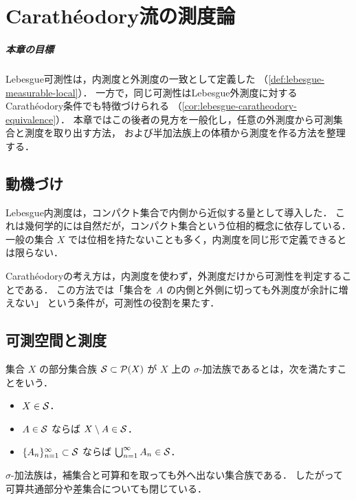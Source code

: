 \setcounter{chapter}{5}
\chapter{Carathéodory流の測度論}

\paragraph{本章の目標}
Lebesgue可測性は，内測度と外測度の一致として定義した
（\cref{def:lebesgue-measurable-local}）．
一方で，同じ可測性はLebesgue外測度に対するCarathéodory条件でも特徴づけられる
（\cref{cor:lebesgue-caratheodory-equivalence}）．
本章ではこの後者の見方を一般化し，任意の外測度から可測集合と測度を取り出す方法，
および半加法族上の体積から測度を作る方法を整理する．

\section{動機づけ}

Lebesgue内測度は，コンパクト集合で内側から近似する量として導入した．
これは幾何学的には自然だが，コンパクト集合という位相的概念に依存している．
一般の集合 $X$ では位相を持たないことも多く，内測度を同じ形で定義できるとは限らない．

Carathéodoryの考え方は，内測度を使わず，外測度だけから可測性を判定することである．
この方法では「集合を $A$ の内側と外側に切っても外測度が余計に増えない」
という条件が，可測性の役割を果たす．

\section{可測空間と測度}

\begin{definition}\label{def:sigma-algebra}
集合 $X$ の部分集合族 $\mathcal S\subset\mathcal P(X)$ が
$X$ 上の $\sigma$-加法族であるとは，次を満たすことをいう．
\begin{itemize}
    \item $X\in\mathcal S$．
    \item $A\in\mathcal S$ ならば $X\setminus A\in\mathcal S$．
    \item $\{A_n\}_{n=1}^{\infty}\subset\mathcal S$ ならば
    $\bigcup_{n=1}^{\infty}A_n\in\mathcal S$．
\end{itemize}
\end{definition}

\begin{remark}
$\sigma$-加法族は，補集合と可算和を取っても外へ出ない集合族である．
したがって可算共通部分や差集合についても閉じている．
\end{remark}


